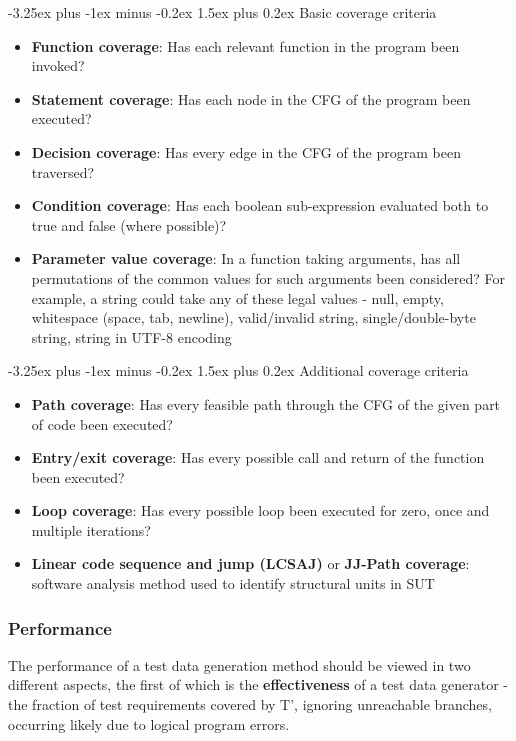 \documentclass{icldt}
\makeatletter
\numberwithin{equation}{section}       %
\renewcommand{\paragraph}{\@startsection{paragraph}{4}{0ex}%
   {-3.25ex plus -1ex minus -0.2ex}%
   {1.5ex plus 0.2ex}%
   {\normalfont\normalsize\bfseries}}
\makeatother
\begin{document}
{\paragraph{Basic coverage criteria}
\begin{itemize}
    \item \textbf{Function coverage}: Has each relevant function in the program been invoked?
    \item \textbf{Statement coverage}: Has each node in the CFG of the program been executed?
    \item \textbf{Decision coverage}: Has every edge in the CFG of the program been traversed?
    \item \textbf{Condition coverage}: Has each boolean sub-expression evaluated both to true and false (where possible)?
    \item \textbf{Parameter value coverage}: In a function taking arguments, has all permutations of the common values for such arguments been considered? For example, a string could take any of these legal values - null, empty, whitespace (space, tab, newline), valid/invalid string, single/double-byte string, string in UTF-8 encoding
\end{itemize}

\paragraph{Additional coverage criteria}
\begin{itemize}
    \item \textbf{Path coverage}: Has every feasible path through the CFG of the given part of code been executed?
    \item \textbf{Entry/exit coverage}: Has every possible call and return of the function been executed?
    \item \textbf{Loop coverage}: Has every possible loop been executed for zero, once and multiple iterations?
    \item \textbf{Linear code sequence and jump (LCSAJ)} or \textbf{JJ-Path coverage}: software analysis method used to identify structural units in SUT
\end{itemize}

\subsubsection{Performance}
The performance of a test data generation method should be viewed in two different aspects, the first of which is the \textbf{effectiveness} of a test data generator - the fraction of test requirements covered by T', ignoring unreachable branches, occurring likely due to logical program errors.

}
\end{document}

